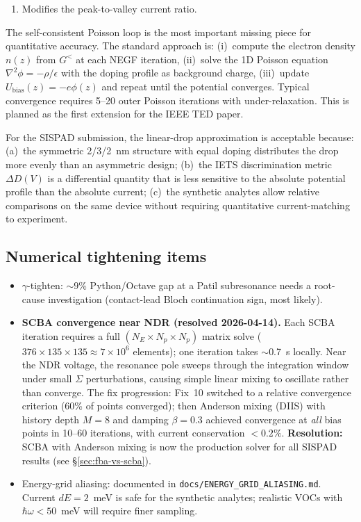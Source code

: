 \documentclass[11pt,a4paper,onecolumn]{article}
\newcommand{\code}[1]{\texttt{\small #1}}
\begin{document}
\begin{itemize}[leftmargin=1.3em,itemsep=0pt]
\begin{enumerate}[leftmargin=1em]
the drop across the collector barrier;
\item Modifies the peak-to-valley current ratio.
\end{enumerate}
The self-consistent Poisson loop is the most important missing piece for
quantitative accuracy. The standard approach is: (i)~compute the electron
density $n(z)$ from $G^<$ at each NEGF iteration, (ii)~solve the 1D
Poisson equation $\nabla^2 \phi = -\rho/\epsilon$ with the doping profile
as background charge, (iii)~update $U_{\mathrm{bias}}(z) = -e\phi(z)$ and
repeat until the potential converges. Typical convergence requires 5--20
outer Poisson iterations with under-relaxation. This is planned as the
first extension for the IEEE TED paper.

For the SISPAD submission, the linear-drop approximation is acceptable
because: (a)~the symmetric 2/3/2~nm structure with equal doping
distributes the drop more evenly than an asymmetric design;
(b)~the IETS discrimination metric $\Delta D(V)$ is a differential
quantity that is less sensitive to the absolute potential profile than
the absolute current; (c)~the synthetic analytes allow relative comparisons
on the same device without requiring quantitative current-matching to
experiment.
\end{itemize}

\subsection{Numerical tightening items}
\begin{itemize}[leftmargin=1.3em,itemsep=0pt]
\item $\gamma$-tighten: $\sim 9$\% Python/Octave gap at a Patil subresonance
needs a root-cause investigation (contact-lead Bloch continuation sign,
most likely).
\item \textbf{SCBA convergence near NDR (resolved 2026-04-14).}
Each SCBA iteration requires a full $(N_E \times N_p \times N_p)$ matrix
solve ($376 \times 135 \times 135 \approx 7\times 10^6$ elements); one
iteration takes $\sim$0.7~s locally. Near the NDR voltage, the resonance
pole sweeps through the integration window under small $\Sigma$ perturbations,
causing simple linear mixing to oscillate rather than converge. The fix
progression: Fix~10 switched to a relative convergence criterion (60\% of
points converged); then Anderson mixing (DIIS) with history depth $M=8$
and damping $\beta = 0.3$ achieved convergence at \emph{all} bias points
in 10--60 iterations, with current conservation $< 0.2\%$.
\textbf{Resolution:} SCBA with Anderson mixing is now the production solver
for all SISPAD results (see \S\ref{sec:fba-vs-scba}).
\item Energy-grid aliasing: documented in
\code{docs/ENERGY\_GRID\_ALIASING.md}. Current $dE = 2$~meV is safe for
the synthetic analytes; realistic VOCs with $\hbar\omega < 50$~meV will
require finer sampling.
\end{itemize}
\end{document}
